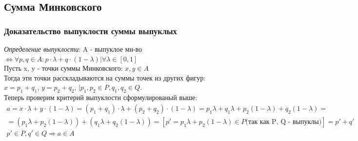 \documentclass{article}
\begin{document}
\subsection*{Сумма Минковского}
\subsubsection*{Доказательство выпуклости суммы выпуклых}
\emph{Определение выпуклости}: A - выпуклое мн-во $\Leftrightarrow \forall p, q \in A: p \cdot \lambda + q \cdot (1 - \lambda) | \forall \lambda \in [0, 1]$\\
Пусть x, y - точки суммы Минковского: $x, y \in A$\\
Тогда эти точки расскладываются на суммы точек из других фигур:\\
$x = p_1 + q_1$, $y = p_2 + q_2$, $|p_1, p_2 \in P, q_1, q_2 \in Q$.\\
Теперь проверим критерий выпуклости сформулированый выше:
\begin{multline*}
    a = x \cdot \lambda + y \cdot (1 - \lambda) = (p_1 + q_1) \cdot \lambda + (p_2 + q_2) \cdot (1 - \lambda) = p_1\lambda + q_1\lambda + p_2(1 - \lambda) + q_2(1 - \lambda) =\\
    = (p_1\lambda + p_2(1 - \lambda)) + (q_1\lambda + q_2(1 - \lambda)) = [p'=p_1\lambda + p_2(1-\lambda) \in P \text{(так как P, Q - выпуклы)}] = p' + q'\\
    p' \in P, q' \in Q \Rightarrow a \in A
\end{multline*}
\end{document}
